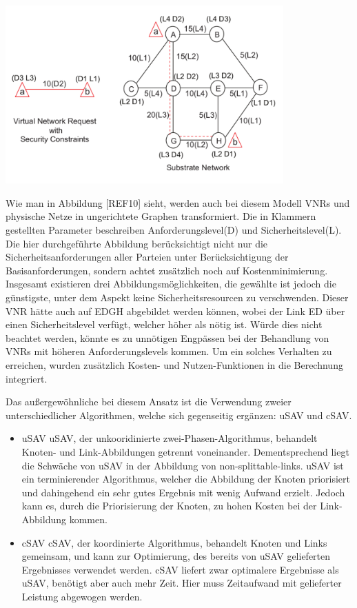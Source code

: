 \documentclass{lni}
\begin{document}
\begin{center}
	\includegraphics[width=0.8\textwidth]{algo2graph.pdf}\newline
\end{center}
Wie man in Abbildung [REF10] sieht, werden auch bei diesem Modell VNRs und physische Netze in ungerichtete Graphen transformiert. Die in Klammern gestellten Parameter beschreiben Anforderungslevel(D) und Sicherheitslevel(L). Die hier durchgeführte Abbildung berücksichtigt nicht nur die Sicherheitsanforderungen aller Parteien unter Berücksichtigung der Basisanforderungen, sondern achtet zusätzlich noch auf Kostenminimierung. Insgesamt existieren drei Abbildungsmöglichkeiten, die gewählte ist jedoch die günstigste, unter dem Aspekt keine Sicherheitsresourcen zu verschwenden. Dieser VNR hätte auch auf EDGH abgebildet werden können, wobei der Link ED über einen Sicherheitslevel verfügt, welcher höher als nötig ist. Würde dies nicht beachtet werden, könnte es zu unnötigen Engpässen bei der Behandlung von VNRs mit höheren Anforderungslevels kommen. Um ein solches Verhalten zu erreichen, wurden zusätzlich Kosten- und Nutzen-Funktionen in die Berechnung integriert.

Das außergewöhnliche bei diesem Ansatz ist die Verwendung zweier unterschiedlicher Algorithmen, welche sich gegenseitig ergänzen: uSAV und cSAV.
\begin{itemize} %
	\item uSAV \newline
	uSAV, der unkooridinierte zwei-Phasen-Algorithmus, behandelt Knoten- und Link-Abbildungen getrennt voneinander. Dementsprechend liegt die Schwäche von uSAV in der Abbildung von non-splittable-links. uSAV ist ein terminierender Algorithmus, welcher die Abbildung der Knoten priorisiert und dahingehend ein sehr gutes Ergebnis mit wenig Aufwand erzielt. Jedoch kann es, durch die Priorisierung der Knoten, zu hohen Kosten bei der Link-Abbildung kommen.

	\item cSAV \newline
	cSAV, der koordinierte Algorithmus, behandelt Knoten und Links gemeinsam, und kann zur Optimierung, des bereits von uSAV gelieferten Ergebnisses verwendet werden. cSAV liefert zwar optimalere Ergebnisse als uSAV, benötigt aber auch mehr Zeit. Hier muss Zeitaufwand mit gelieferter Leistung abgewogen werden.

\end{itemize} 
\end{document}
